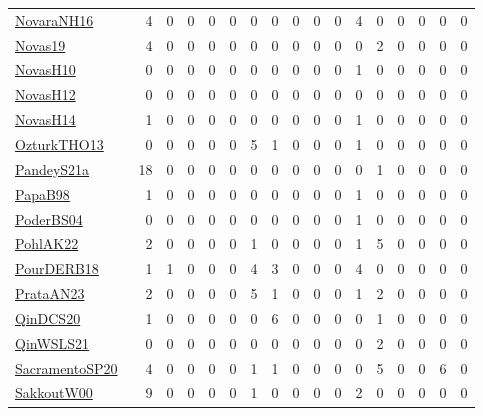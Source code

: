 {\begin{longtable}{l*{16}{r}}
\href{articles/NovaraNH16.pdf}{NovaraNH16}~\cite{NovaraNH16} & 4 & 0 & 0 & 0 & 0 & 0 & 0 & 0 & 0 & 0 & 4 & 0 & 0 & 0 & 0 & 0\\
\href{articles/Novas19.pdf}{Novas19}~\cite{Novas19} & 4 & 0 & 0 & 0 & 0 & 0 & 0 & 0 & 0 & 0 & 0 & 2 & 0 & 0 & 0 & 0\\
\href{articles/NovasH10.pdf}{NovasH10}~\cite{NovasH10} & 0 & 0 & 0 & 0 & 0 & 0 & 0 & 0 & 0 & 0 & 1 & 0 & 0 & 0 & 0 & 0\\
\href{articles/NovasH12.pdf}{NovasH12}~\cite{NovasH12} & 0 & 0 & 0 & 0 & 0 & 0 & 0 & 0 & 0 & 0 & 0 & 0 & 0 & 0 & 0 & 0\\
\href{articles/NovasH14.pdf}{NovasH14}~\cite{NovasH14} & 1 & 0 & 0 & 0 & 0 & 0 & 0 & 0 & 0 & 0 & 1 & 0 & 0 & 0 & 0 & 0\\
\href{articles/OzturkTHO13.pdf}{OzturkTHO13}~\cite{OzturkTHO13} & 0 & 0 & 0 & 0 & 0 & 5 & 1 & 0 & 0 & 0 & 1 & 0 & 0 & 0 & 0 & 0\\
\href{articles/PandeyS21a.pdf}{PandeyS21a}~\cite{PandeyS21a} & 18 & 0 & 0 & 0 & 0 & 0 & 0 & 0 & 0 & 0 & 0 & 1 & 0 & 0 & 0 & 0\\
\href{articles/PapaB98.pdf}{PapaB98}~\cite{PapaB98} & 1 & 0 & 0 & 0 & 0 & 0 & 0 & 0 & 0 & 0 & 1 & 0 & 0 & 0 & 0 & 0\\
\href{articles/PoderBS04.pdf}{PoderBS04}~\cite{PoderBS04} & 0 & 0 & 0 & 0 & 0 & 0 & 0 & 0 & 0 & 0 & 1 & 0 & 0 & 0 & 0 & 0\\
\href{articles/PohlAK22.pdf}{PohlAK22}~\cite{PohlAK22} & 2 & 0 & 0 & 0 & 0 & 1 & 0 & 0 & 0 & 0 & 1 & 5 & 0 & 0 & 0 & 0\\
\href{articles/PourDERB18.pdf}{PourDERB18}~\cite{PourDERB18} & 1 & 1 & 0 & 0 & 0 & 4 & 3 & 0 & 0 & 0 & 4 & 0 & 0 & 0 & 0 & 0\\
\href{articles/PrataAN23.pdf}{PrataAN23}~\cite{PrataAN23} & 2 & 0 & 0 & 0 & 0 & 5 & 1 & 0 & 0 & 0 & 1 & 2 & 0 & 0 & 0 & 0\\
\href{articles/QinDCS20.pdf}{QinDCS20}~\cite{QinDCS20} & 1 & 0 & 0 & 0 & 0 & 0 & 6 & 0 & 0 & 0 & 0 & 1 & 0 & 0 & 0 & 0\\
\href{articles/QinWSLS21.pdf}{QinWSLS21}~\cite{QinWSLS21} & 0 & 0 & 0 & 0 & 0 & 0 & 0 & 0 & 0 & 0 & 0 & 2 & 0 & 0 & 0 & 0\\
\href{articles/SacramentoSP20.pdf}{SacramentoSP20}~\cite{SacramentoSP20} & 4 & 0 & 0 & 0 & 0 & 1 & 1 & 0 & 0 & 0 & 0 & 5 & 0 & 0 & 6 & 0\\
\href{articles/SakkoutW00.pdf}{SakkoutW00}~\cite{SakkoutW00} & 9 & 0 & 0 & 0 & 0 & 1 & 0 & 0 & 0 & 0 & 2 & 0 & 0 & 0 & 0 & 0\\

\end{longtable}}
